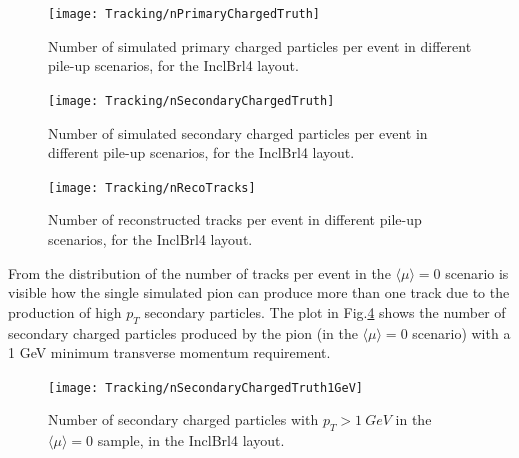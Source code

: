 \documentclass[a4paper,twoside,12pt]{book}
\begin{document}
\begin{figure}
\centering
\texttt{[image: Tracking/nPrimaryChargedTruth]}
\caption{Number of simulated primary charged particles per event in different pile-up scenarios, for the InclBrl4 layout.}
\label{fig:tracking:nPrimaryChargedTruth}
\end{figure}

\begin{figure}
\centering
\texttt{[image: Tracking/nSecondaryChargedTruth]}
\caption{Number of simulated secondary charged particles per event in different pile-up scenarios, for the InclBrl4 layout.}
\label{fig:tracking:nSecondaryChargedTruth}
\end{figure}


\begin{figure}
\centering
\texttt{[image: Tracking/nRecoTracks]}
\caption{Number of reconstructed tracks per event in different pile-up scenarios, for the InclBrl4 layout.}
\label{fig:tracking:nRecoTracks}
\end{figure}

From the distribution of the number of tracks per event in the $\langle\mu\rangle = 0$ scenario is visible
how the single simulated pion can produce more than one track due to the production of high $p_{T}$ secondary particles. The plot in Fig.\ref{fig:tracking:nSecondaryChargedTruth1GeV} shows the number of secondary charged particles produced by the pion (in the $\langle\mu\rangle = 0$ scenario)
with a 1 GeV minimum transverse momentum requirement. \\

\begin{figure}
\centering
\texttt{[image: Tracking/nSecondaryChargedTruth1GeV]}
\caption{Number of secondary charged particles with $p_T > 1\ GeV$ in the \mbox{$\langle\mu\rangle = 0$} sample, in the InclBrl4 layout.}
\label{fig:tracking:nSecondaryChargedTruth1GeV}
\end{figure}
\end{document}
